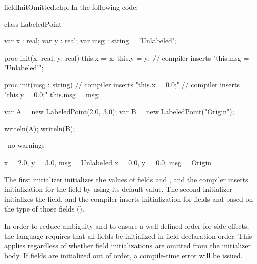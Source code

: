 \begin{chapelexample}{fieldInitOmitted.chpl}
In the following code:
\begin{chapel}
class LabeledPoint {
  var x : real;
  var y : real;
  var msg : string = 'Unlabeled';

  proc init(x: real, y: real) {
    this.x = x;
    this.y = y;
    // compiler inserts "this.msg = 'Unlabeled'";
  }

  proc init(msg : string) {
    // compiler inserts "this.x = 0.0;"
    // compiler inserts "this.y = 0.0;"
    this.msg = msg;
  }
}

var A = new LabeledPoint(2.0, 3.0);
var B = new LabeledPoint("Origin");
\end{chapel}
\begin{chapelpost}
writeln(A);
writeln(B);
\end{chapelpost}
\begin{chapelcompopts}
--no-warnings
\end{chapelcompopts}
\begin{chapeloutput}
{x = 2.0, y = 3.0, msg = Unlabeled}
{x = 0.0, y = 0.0, msg = Origin}
\end{chapeloutput}
The first initializer initializes the values of fields  and ,
and the compiler inserts initialization for the  field by using
its default value. The second initializer initializes the  field,
and the compiler inserts initialization for fields  and 
based on the type of those fields ().
\end{chapelexample}

In order to reduce ambiguity and to ensure a well-defined order for
side-effects, the language requires that all fields be initialized in field
declaration order. This applies regardless of whether field initializations are
omitted from the initializer body. If fields are initialized out of order, a
compile-time error will be issued.

